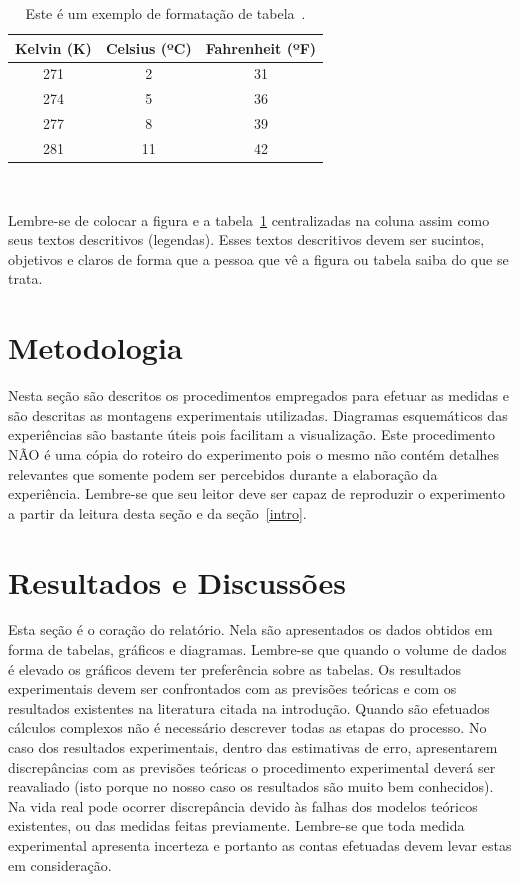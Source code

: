 \documentclass[a4paper, 12pt]{article}
\begin{document}
\begin{table}
\centering
\caption{Este é um exemplo de formatação de tabela~\cite{michael}.}
\begin{tabular}{|c|c|c|}
\hline
Kelvin (K) & Celsius (ºC) & Fahrenheit (ºF) \\ \hline
271 & 2 & 31 \\ \hline
274 & 5 & 36 \\ \hline
277 & 8 & 39 \\ \hline
281 & 11 & 42 \\ \hline
\end{tabular}\\
\label{table1}
\end{table}

Lembre-se de colocar a figura e a tabela~\ref{table1} centralizadas na coluna assim como seus textos descritivos (legendas). Esses textos descritivos devem ser sucintos, objetivos e claros de forma que a pessoa que vê a figura ou tabela saiba do que se trata.

\section{Metodologia}
Nesta seção são descritos os procedimentos empregados para efetuar as medidas e são descritas as montagens experimentais utilizadas. Diagramas esquemáticos das experiências são bastante úteis pois facilitam a visualização.  Este procedimento NÃO é uma cópia do roteiro do experimento pois o mesmo não contém detalhes relevantes que somente podem ser percebidos durante a elaboração da experiência. Lembre-se que seu leitor deve ser capaz de reproduzir o experimento a partir da leitura desta seção e da seção~\ref{intro}.

\section{Resultados e Discussões}
Esta seção é o coração do relatório. Nela são apresentados os dados obtidos em forma de tabelas, gráficos e diagramas. Lembre-se que quando o volume de dados é elevado os gráficos devem ter preferência sobre as tabelas. Os resultados experimentais devem ser confrontados com as previsões teóricas e com os resultados existentes na literatura citada na introdução. Quando são efetuados cálculos complexos não é necessário descrever todas as etapas do processo. No caso dos resultados experimentais, dentro das estimativas de erro, apresentarem discrepâncias com as previsões teóricas o procedimento experimental deverá ser reavaliado (isto porque no nosso caso os resultados são muito bem conhecidos). Na vida real pode ocorrer discrepância devido às falhas dos modelos teóricos existentes, ou das medidas feitas previamente. Lembre-se que toda medida experimental apresenta incerteza e portanto as contas efetuadas devem levar estas em consideração.
\end{document}
